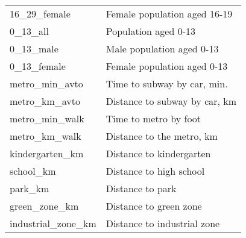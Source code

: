 \begin{longtable}[c]{ll}
    16\_29\_female                             & Female population aged 16-19                                                                                              \\
    0\_13\_all                                 & Population aged 0-13                                                                                                      \\
    0\_13\_male                                & Male population aged 0-13                                                                                                 \\
    0\_13\_female                              & Female population aged 0-13                                                                                               \\
    metro\_min\_avto                           & Time to subway by car, min.                                                                                               \\
    metro\_km\_avto                            & Distance to subway by car, km                                                                                             \\
    metro\_min\_walk                           & Time to metro by foot                                                                                                     \\
    metro\_km\_walk                            & Distance to the metro, km                                                                                                 \\
    kindergarten\_km                           & Distance to kindergarten                                                                                                  \\
    school\_km                                 & Distance to high school                                                                                                   \\
    park\_km                                   & Distance to park                                                                                                          \\
    green\_zone\_km                            & Distance to green zone                                                                                                    \\
    industrial\_zone\_km                       & Distance to industrial zone                                                                                               \\

\end{longtable}
